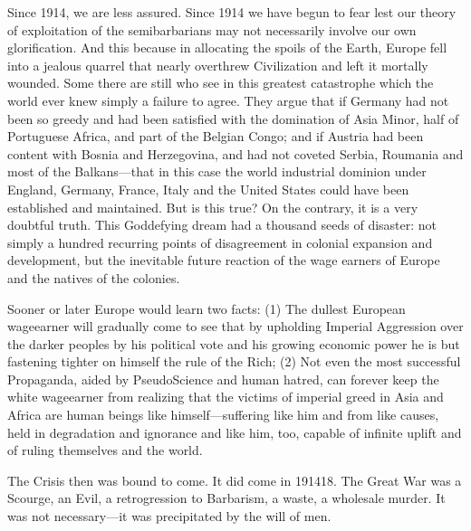 \documentclass[letterpaper,10pt,english]{jupyterBook}
\begin{document}
\sphinxAtStartPar
Since 1914, we are less assured. Since 1914 we have begun to fear lest our theory of exploitation of the semi\sphinxhyphen{}barbarians may not necessarily involve our own glorification. And this because in allocating the spoils of the Earth, Europe fell into a jealous quarrel that nearly overthrew Civilization and left it mortally wounded. Some there are still who see in this greatest catastrophe which the world ever knew simply a failure to agree. They argue that if Germany had not been so greedy and had been satisfied with the domination of Asia Minor, half of Portuguese Africa, and part of the Belgian Congo; and if Austria had been content with Bosnia and Herzegovina, and had not coveted Serbia, Roumania and most of the Balkans—that in this case the world industrial dominion under England, Germany, France, Italy and the United States could have been established and maintained. But is this true? On the contrary, it is a very doubtful truth. This God\sphinxhyphen{}defying dream had a thousand seeds of disaster: not simply a hundred recurring points of disagreement in colonial expansion and development, but the inevitable future reaction of the wage earners of Europe and the natives of the colonies.

\sphinxAtStartPar
Sooner or later Europe would learn two facts: (1) The dullest European wage\sphinxhyphen{}earner will gradually come to see that by upholding Imperial Aggression over the darker peoples by his political vote and his growing economic power he is but fastening tighter on himself the rule of the Rich; (2) Not even the most successful Propaganda, aided by Pseudo\sphinxhyphen{}Science and human hatred, can forever keep the white wage\sphinxhyphen{}earner from realizing that the victims of imperial greed in Asia and Africa are human beings like himself—suffering like him and from like causes, held in degradation and ignorance and like him, too, capable of infinite uplift and of ruling themselves and the world.

\sphinxAtStartPar
The Crisis then was bound to come. It did come in 1914\sphinxhyphen{}18. The Great War was a Scourge, an Evil, a retrogression to Barbarism, a waste, a wholesale murder. It was not necessary—it was precipitated by the will of men.
\end{document}
